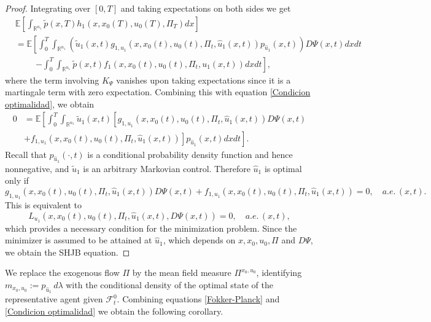 \documentclass[12pt]{article}
\theoremstyle{definition}
\begin{document}
\begin{proof}
Integrating over $[0,T]$ and taking expectations on both sides we get
    \begin{align*}
        & \mathbb{E}\left[\int_{\mathbb{R}^{n_1}}\tilde{p}(x,T)h_1(x,x_0(T),u_0(T),\Pi_T)dx\right] \\
        &=\mathbb{E}\left[\int_0^T\int_{\mathbb{R}^{n_1}}\left( \tilde{u}_1(x,t)g_{1,u_1}(x,x_0(t),u_0(t),\Pi_t,\hat{u}_1(x,t))p_{\hat{u}_1}(x,t) \right)D\Psi(x,t)dxdt \right.\\
        &\hspace{1cm} \left.-\int_0^T\int_{\mathbb{R}^{n_1}}\tilde{p}(x,t) f_1(x, x_0(t), u_0(t), \Pi_t, u_1(x,t)) dxdt\right],
    \end{align*}
where the term involving $K_\Psi$ vanishes upon taking expectations since it is a martingale term with zero expectation. Combining this with equation \eqref{Condicion optimalidad}, we obtain
    \begin{align*}
        0 &= \mathbb{E}\left[\int_0^T\int_{\mathbb{R}^{n_1}} \tilde{u}_1(x,t)\left[g_{1,u_1}(x,x_0(t),u_0(t),\Pi_t,\hat{u}_1(x,t))D\Psi(x,t) \right. \right. \\
        &+ \left. \left. f_{1,u_1}(x,x_0(t),u_0(t),\Pi_t,\hat{u}_1(x,t))\right] p_{\hat{u}_1}(x,t)dxdt\right].
    \end{align*}
Recall that $p_{\hat{u}_1}(\cdot,t)$ is a conditional probability density function and hence nonnegative, and $\tilde{u}_1$ is an arbitrary Markovian control. Therefore $\hat{u}_1$ is optimal only if
    $$g_{1,u_1}(x,x_0(t),u_0(t),\Pi_t,\hat{u}_1(x,t))D\Psi(x,t)+ f_{1,u_1}(x,x_0(t),u_0(t),\Pi_t,\hat{u}_1(x,t))=0,\quad a.e.\,(x,t).$$
This is equivalent to
    $$L_{u_1}(x,x_0(t),u_0(t),\Pi_t,\hat{u}_1(x,t), D\Psi(x,t))=0,\quad a.e.\,(x,t),$$
which provides a necessary condition for the minimization problem. Since the minimizer is assumed to be attained at $\hat{u}_1$, which depends on $x, x_0, u_0, \Pi$ and $D\Psi$, we obtain the SHJB equation.
\end{proof}

We replace the exogenous flow $\Pi$ by the mean field measure $\Pi^{x_0,u_0}$, identifying $m_{x_0,u_0}:=p_{\hat{u}_1}\,d\lambda$ with the conditional density of the optimal state of the representative agent given $\mathcal{F}_t^0$. Combining equations \eqref{Fokker-Planck} and \eqref{Condicion optimalidad} we obtain the following corollary.
\end{document}
